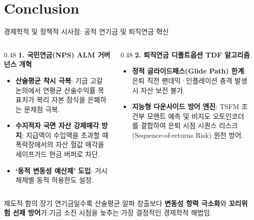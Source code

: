 \section{Conclusion}

\begin{frame}{경제학적 및 정책적 시사점: 공적 연기금 및 퇴직연금 혁신}
\begin{columns}[T]
  \begin{column}{0.48\textwidth}
    \textbf{1. 국민연금(NPS) ALM 거버넌스 개혁}
    \begin{itemize}
      \setlength{\itemsep}{4pt}
      \small
      \item \textbf{산술평균 착시 극복}:
      기금 고갈 논의에서 연평균 산술수익률 목표치가 복리 자본 잠식을 은폐하는 문제점 극복.
      \item \textbf{수지적자 국면 자산 강제매각 방지}:
      지급액이 수입액을 초과할 때 폭락장에서의 자산 헐값 매각을 세이프가드 현금 버퍼로 차단.
      \item \textbf{`동적 변동성 예산제' 도입}:
      거시 체제별 동적 허용한도 설정.
    \end{itemize}
  \end{column}
  
  \begin{column}{0.48\textwidth}
    \textbf{2. 퇴직연금 디폴트옵션 TDF 알고리즘}
    \begin{itemize}
      \setlength{\itemsep}{4pt}
      \small
      \item \textbf{정적 글라이드패스(Glide Path) 한계}:
      은퇴 직전 팬데믹·인플레이션 충격 발생 시 자산 보전 불가.
      \item \textbf{지능형 다운사이드 방어 엔진}:
      TSFM 조건부 모멘트 예측 및 비지도 오토인코더를 결합하여 은퇴 시점 시퀀스 리스크(Sequence-of-returns Risk) 원천 방어.
    \end{itemize}
  \end{column}
\end{columns}

\vspace{3mm}
\begin{block}{제도적 함의}
  \small 장기 연기금일수록 산술평균 알파 창출보다 \textbf{변동성 항력 극소화}와 \textbf{꼬리위험 선제 방어}가 기금 소진 시점을 늦추는 가장 결정적인 경제학적 해법임.
\end{block}
\end{frame}


